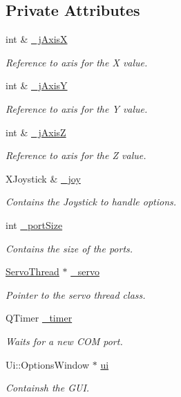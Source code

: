 \subsection*{Private Attributes}
\begin{DoxyCompactItemize}
\item 
int \& \hyperlink{a00006_a01d6284355011203ee6e8856a0bdf557}{\+\_\+j\+Axis\+X}
\begin{DoxyCompactList}\small\item\em Reference to axis for the X value. \end{DoxyCompactList}\item 
int \& \hyperlink{a00006_a8921d1cc5bcb527466c28feb5dcc59b1}{\+\_\+j\+Axis\+Y}
\begin{DoxyCompactList}\small\item\em Reference to axis for the Y value. \end{DoxyCompactList}\item 
int \& \hyperlink{a00006_a47409f50a87942706baaea3d025785e3}{\+\_\+j\+Axis\+Z}
\begin{DoxyCompactList}\small\item\em Reference to axis for the Z value. \end{DoxyCompactList}\item 
X\+Joystick \& \hyperlink{a00006_a1bf846ab681ab245f70adac30999947c}{\+\_\+joy}
\begin{DoxyCompactList}\small\item\em Contains the Joystick to handle options. \end{DoxyCompactList}\item 
int \hyperlink{a00006_a9bd4dccc7a544b1db78dc8cf330b88f6}{\+\_\+port\+Size}
\begin{DoxyCompactList}\small\item\em Contains the size of the ports. \end{DoxyCompactList}\item 
\hyperlink{a00008}{Servo\+Thread} $\ast$ \hyperlink{a00006_acba1566fea3f831000d5e1c1edc3e776}{\+\_\+servo}
\begin{DoxyCompactList}\small\item\em Pointer to the servo thread class. \end{DoxyCompactList}\item 
Q\+Timer \hyperlink{a00006_af6320942b8558140989f552b3bbc1fbd}{\+\_\+timer}
\begin{DoxyCompactList}\small\item\em Waits for a new C\+O\+M port. \end{DoxyCompactList}\item 
Ui\+::\+Options\+Window $\ast$ \hyperlink{a00006_a8347442d5b3b670e8fff0c4102db1f88}{ui}
\begin{DoxyCompactList}\small\item\em Containsh the G\+U\+I. \end{DoxyCompactList}\end{DoxyCompactItemize}



